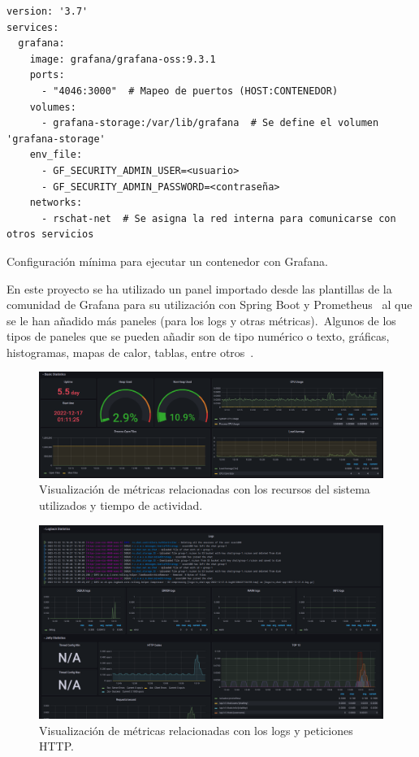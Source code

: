 \begin{codeBlock}
	\begin{verbatim}
version: '3.7'
services:
  grafana:
    image: grafana/grafana-oss:9.3.1
    ports:
      - "4046:3000"  # Mapeo de puertos (HOST:CONTENEDOR)
    volumes:
      - grafana-storage:/var/lib/grafana  # Se define el volumen 'grafana-storage'
    env_file:
      - GF_SECURITY_ADMIN_USER=<usuario>
      - GF_SECURITY_ADMIN_PASSWORD=<contraseña>
    networks:
      - rschat-net  # Se asigna la red interna para comunicarse con otros servicios
	\end{verbatim}
	\caption{Configuración mínima para ejecutar un contenedor con Grafana.}
	\label{cod:grafana-docker-compose}
\end{codeBlock}

En este proyecto se ha utilizado un panel importado desde las plantillas de la comunidad de Grafana para su utilización
con Spring Boot y Prometheus~\cite{spring-dashboard} al que se le han añadido más paneles (para los logs y otras
métricas).\ Algunos de los tipos de paneles que se pueden añadir son de tipo numérico o texto, gráficas, histogramas,
mapas de calor, tablas, entre otros~\cite{visualizaciones-grafana}.

\begin{figure}[H]
	\centering
	\includegraphics[width=\textwidth]{res/images/GrafanaDashboard_1}
	\caption{Visualización de métricas relacionadas con los recursos del sistema utilizados y tiempo de actividad.}
	\label{fig:grafana-dashboard_1}
\end{figure}

\begin{figure}[H]
	\centering
	\includegraphics[width=\textwidth]{res/images/GrafanaDashboard_2}
	\caption{Visualización de métricas relacionadas con los logs y peticiones HTTP.}
	\label{fig:grafana-dashboard_2}
\end{figure}

